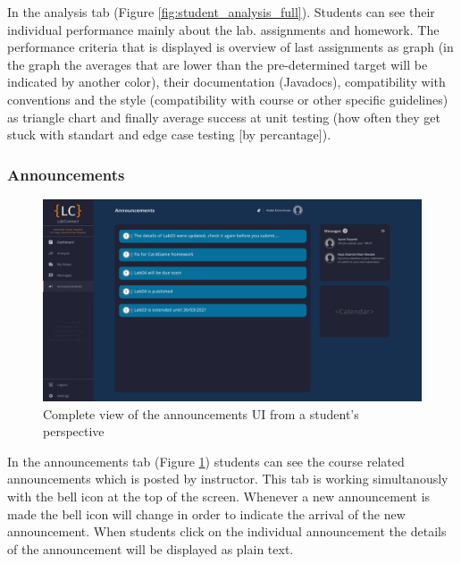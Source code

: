 \documentclass[a4paper, 12pt]{article}
\begin{document}
    In the analysis tab (Figure \ref{fig:student_analysis_full}). Students can see their individual performance mainly about the lab. assignments and homework.
    The performance criteria that is displayed is overview of last assignments as graph (in the graph the averages that are lower than the 
    pre-determined target will be indicated by another color), their documentation (Javadocs), compatibility with conventions and the style 
    (compatibility with course or other specific guidelines) as triangle chart and finally average success at unit testing (how often they 
    get stuck with standart and edge case testing [by percantage]).

    
    \pagebreak
    
    \subsubsection{Announcements}
    
    \begin{figure}[H]
        \centering
        \includegraphics[width=\textwidth]{student_announcements}
        \caption{Complete view of the announcements UI from a student's perspective}
        \label{fig:student_announcements_full}
    \end{figure}
    
    In the announcements tab (Figure \ref{fig:student_announcements_full}) students can see the course related announcements which is posted by instructor. This tab is working simultanously
    with the bell icon at the top of the screen. Whenever a new announcement is made the bell icon will change in order to indicate the arrival of the 
    new announcement. When students click on the individual announcement the details of the announcement will be displayed as plain text.
    
    
    \pagebreak
    
\end{document}
